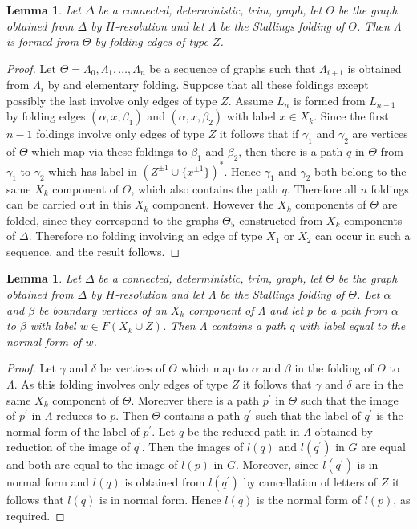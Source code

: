 \documentclass[a4paper,12pt]{article}
\renewcommand{\a}{\alpha }
\renewcommand{\b}{\beta }
\newcommand{\g}{\gamma }
\newcommand{\D}{\Delta }
\renewcommand{\d}{\delta }
\newcommand{\T}{\Theta }
\renewcommand{\L}{\Lambda }
\newtheorem{lemma}[theorem]{Lemma}
\numberwithin{equation}{section}
\numberwithin{figure}{section}
\begin{document}
\begin{lemma}
Let $\D$ be  a connected, deterministic, trim, graph, let $\T$ be
the graph
obtained from $\D$ by $H$-resolution %
and let
$\L$ be the Stallings folding of $\T$. Then $\L$ is formed from
$\T$ by folding edges of type $Z$.
\end{lemma}
\begin{proof}
Let $\T=\L_0,\L_1,\ldots, \L_n$ be a sequence of graphs such that
$\L_{i+1}$ is obtained from $\L_i$ by and elementary folding.
Suppose that all these foldings except possibly the last involve only edges
of type $Z$. Assume $L_n$ is formed from $L_{n-1}$ by folding edges
$(\a,x,\b_1)$ and $(\a,x,\b_2)$ with label $x\in X_k$. Since the
first $n-1$ foldings involve only edges of type $Z$ it follows that
if $\g_1$ and $\g_2$ are vertices of $\T$ which map via these foldings
to $\b_1$ and $\b_2$, then there is a path $q$ in $\T$ from $\g_1$ to $\g_2$
which has label in $(Z^{\pm 1}\cup \{x^{\pm 1}\})^\ast$. Hence $\g_1$ and $\g_2$ both belong to
 the same $X_k$ component of $\T$, which also contains the path $q$.
Therefore all $n$ foldings can be carried out in this $X_k$
component. However the $X_k$ components of $\T$ are folded, since they
correspond to the graphs $\T_5$ constructed from $X_k$ components of $\D$.
Therefore no folding involving an edge of type $X_1$ or $X_2$ can occur
in such a sequence, and the result follows.
\end{proof}
\begin{lemma}
Let $\D$ be  a connected, deterministic, trim, graph, let $\T$ be
the graph
obtained from $\D$ by $H$-resolution %
and let
$\L$ be the Stallings folding of $\T$. Let $\a$  and $\b$ be boundary
vertices of an $X_k$ component of $\L$ and let $p$ be a path from
$\a$ to $\b$ with label $w\in F(X_k\cup Z)$. Then $\L$ contains a
path $q$ with label equal to the normal form of $w$.
\end{lemma}
\begin{proof}
Let $\g$ and $\d$ be vertices of $\T$ which map to $\a$ and $\b$ in the
folding of $\T$ to $\L$. As this folding involves only edges of type $Z$
it follows that $\g$ and $\d$ are in the same $X_k$ component of $\T$.
Moreover there is a path $p^\prime$ in $\T$ such that the image
of $p^\prime$ in $\L$ reduces to $p$. Then $\T$ contains a path
$q^\prime$ such that the label of $q^\prime$ is the normal form of
the label of $p^\prime$. Let $q$ be the reduced path in $\L$ obtained by
reduction of the image of $q^\prime$. Then the images of $l(q)$ and
$l(q^\prime)$ in $G$ are equal and both are equal to the image of $l(p)$ in
$G$. Moreover, since $l(q^\prime)$ is in normal form and $l(q)$ is obtained
from $l(q^\prime)$ by cancellation of letters of $Z$ it follows that
$l(q)$ is in normal form. Hence $l(q)$ is the normal form of $l(p)$,
as required.
\end{proof}
\end{document}
